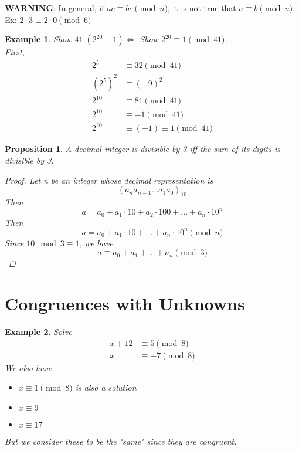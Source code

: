 \documentclass[letterpaper]{article}
\newtheorem{proposition}{Proposition}[section]
\newtheorem{example}{Example}[theorem]
\begin{document}
    \textbf{WARNING}: In general, if $ac\equiv bc\pmod{n}$, it is not true that 
    $a\equiv b\pmod{n}$. 
    Ex: $2\cdot 3\equiv 2\cdot 0\pmod{6}$

    \begin{example}
        Show $41|(2^{20}-1) \Leftrightarrow$ Show $2^{20}\equiv 1 \pmod{41}$. \\
        First, 
        \begin{align*}
            2^5 & \equiv 32 \pmod{41} \\
            (2^5)^2 & \equiv (-9)^2 \\
            2^{10} & \equiv 81 \pmod{41} \\
            2^{10} & \equiv -1 \pmod{41} \\
            2^{20} & \equiv (-1) \equiv 1 \pmod{41} 
        \end{align*}
    \end{example}

    \begin{proposition}
        A decimal integer is divisible by 3 iff the sum of its digits is 
        divisible by 3.
        \begin{proof}
            Let n be an integer whose decimal representation is 
            \[ (a_na_{n-1}\dots a_1a_0)_{10} \]
            Then 
            \[ a=a_0+a_1\cdot 10+a_2\cdot 100+\dots+a_n\cdot 10^n \]
            Then
            \[ a=a_0+a_1\cdot 10+\dots+a_n\cdot 10^n \pmod{n}\]
            Since $10\mod 3\equiv 1$, we have
            \[ a\equiv a_0+a_1+\dots+a_n\pmod{3} \]
        \end{proof}
    \end{proposition}

\section{Congruences with Unknowns}
    \begin{example}
        Solve
        \begin{align*}
            x+12 &\equiv 5\pmod{8} \\
            x &\equiv -7\pmod{8}
        \end{align*}
        We also have
        \begin{itemize}
            \item $x\equiv 1\pmod{8}$ is also a solution
            \item $x\equiv 9$
            \item $x\equiv 17$
        \end{itemize}
        But we consider these to be the "same" since they are congruent.
    \end{example}
\end{document}
